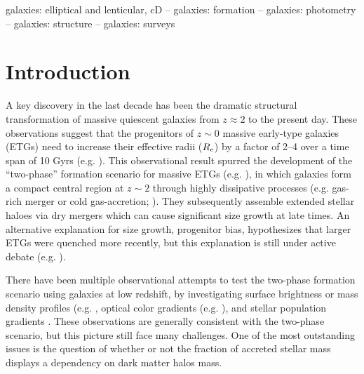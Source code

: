 \documentclass[a4paper,fleqn,usenatbib]{mnras}
\begin{document}
\begin{keywords}
    galaxies: elliptical and lenticular, cD --
    galaxies: formation --
    galaxies: photometry -- 
    galaxies: structure -- 
    galaxies: surveys
\end{keywords}





\section{Introduction}
    \label{sec:intro}
    
    A key discovery in the last 
    decade has been the dramatic structural transformation of massive quiescent 
    galaxies \citep[e.g.][]{Trujillo2006, vanDokkum2008, Cimatti2008, Damjanov2009, 
    vanderWel2011, Szomoru2012, Patel2013} from $z \approx 2$ to the present day. 
    These observations suggest that the progenitors of $z{\sim} 0$ massive early-type 
    galaxies (ETGs) need to increase their effective radii ($R_{\rm e}$) by a factor 
    of 2--4 over a time span of 10 Gyrs (e.g. \citealt{Newman2012, vdWel2014}). 
    This observational result spurred the development of the ``two-phase'' formation
    scenario for massive ETGs (e.g. \citealt{Oser2010, Oser2012}),
    in which galaxies form a compact central region at $z\sim 2$ through highly 
    dissipative processes (e.g. gas-rich merger or cold gas-accretion;
    \citealt{Hopkins2008, Dekel2009}). 
    They subsequently assemble extended stellar haloes via dry mergers 
    \citep[e.g,][]{Naab2006, Khochfar2006, Oser2010, Oser2012} which can cause 
    significant size growth at late times. 
    An alternative explanation for size growth, progenitor bias, hypothesizes that 
    larger ETGs were quenched more recently, but this explanation is still under 
    active debate (e.g. \citealt{Newman2012, Carollo2013, Poggianti2013, Belli2015,
    Keating2015, Fagioli2016}). 
    
    There have been multiple observational attempts to test the two-phase 
    formation scenario using galaxies at low redshift, by investigating surface 
    brightness or mass density profiles (e.g. \citealt{Huang2013a, Huang2013b, 
    Oh2017}, optical color gradients (e.g. \citealt{LaBarbera2010, LaBarbera2012}), 
    and stellar population gradients \citep[e.g.,][]{Coccato2010, Coccato2011, 
    Greene2015, Barbosa2016}. 
    These observations are generally consistent with the two-phase scenario, 
    but this picture still face many challenges.
    One of the most outstanding issues is the question of whether or not the 
    fraction of accreted stellar mass displays a dependency on dark matter halos mass.  
    
\end{document}

